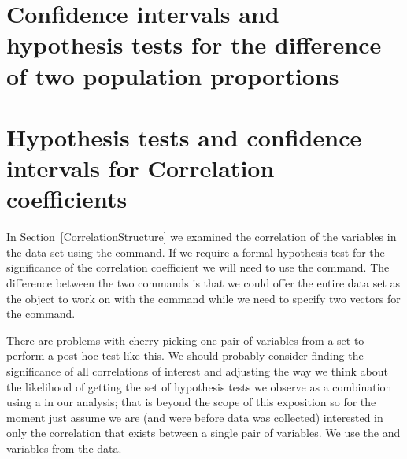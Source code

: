 \section{Confidence intervals and hypothesis tests for the difference of two population proportions}

\section{Hypothesis tests and confidence intervals for Correlation coefficients}

In Section~\ref{CorrelationStructure}
we examined the correlation of the variables in the  data set using the  command. 
If we require a formal hypothesis test for the significance of the correlation coefficient we will need to use the  command. The difference between the two commands is that we could offer the entire data set as the object to work on with the  command while we need to specify two vectors for the  command.

There are problems with cherry-picking one pair of variables from a set to perform a post hoc test like this. We should probably consider finding the significance of all correlations of interest and adjusting the way we think about the likelihood of getting the set of hypothesis tests we observe as a combination using a  in our analysis; that is beyond the scope of this exposition so for the moment just assume we are (and were before data was collected) interested in only the correlation that exists between a single pair of variables. We use the  and  variables from the  data.

